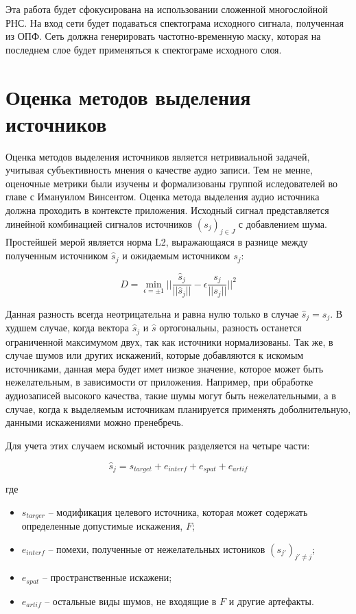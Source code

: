 Эта работа будет сфокусирована на использовании сложенной многослойной РНС. На вход сети будет подаваться спектограма исходного сигнала, полученная из ОПФ. Сеть должна генерировать частотно-временную маску, которая на последнем слое будет применяться к спектограме исходного слоя.

\section{Оценка методов выделения источников}

Оценка методов выделения источников является нетривиальной задачей, учитывая субъективность мнения о качестве аудио записи. Тем не менне, оценочные метрики были изучены и формализованы группой иследователей во главе с Имануилом Винсентом\cite{Vincent}.
Оценка метода выделения аудио источника должна проходить в контексте приложения. Исходный сигнал представляется линейной комбинацией сигналов источников $(s_j)_{j\in J}$ с добавлением шума. Простейшей мерой является норма L2, выражающаяся в разнице между полученным источником $\hat{s}_j$ и ожидаемым источником $s_j$:

\begin{equation}
D = \min_{\epsilon=\pm 1} \Bigg | \Bigg | \frac{\hat{s}_j}{||\hat{s}_j||} - \epsilon \frac{s_j}{||s_j||} \Bigg | \Bigg |^2
\end{equation}

Данная разность всегда неотрицательна и равна нулю только в случае $\hat{s}_j = s_j$. В худшем случае, когда вектора $\hat{s}_j$ и $\hat{s}$ ортогональны, разность останется ограниченной максимумом двух, так как источники нормализованы. Так же, в случае шумов или других искажений, которые добавляются к искомым источниками, данная мера будет имет низкое значение, которое может быть нежелательным, в зависимости от приложения. Например, при обработке аудиозаписей высокого качества, такие шумы могут быть нежелательными, а в случае, когда к выделяемым источникам планируется применять доболнительную, данными искажениями можно пренебречь.

Для учета этих случаем искомый источник разделяется на четыре части:

\begin{equation}
\hat{s}_j = s_{target} + e_{interf} + e_{spat} + e_{artif}
\label{anal:source}
\end{equation}

где

\begin{itemize}
	\item $s_{targer}$ -- модификация целевого источника, которая может содержать определенные допустимые искажения, $F$;
	\item $e_{interf}$ -- помехи, полученные от нежелательных истоников $(s_{j'})_{j' \neq j}$;
	\item $e_{spat}$ -- пространственные искажени;
	\item $e_{artif}$ -- остальные виды шумов, не входящие в $F$ и другие артефакты.
\end{itemize}

